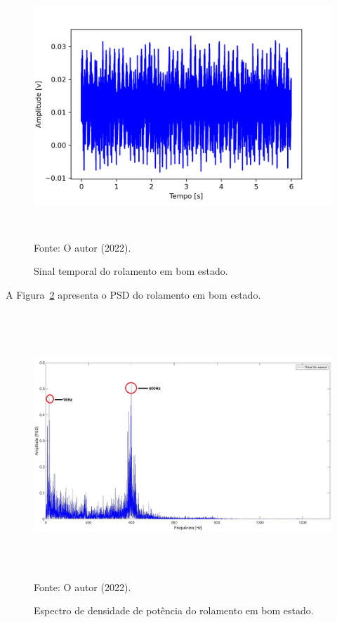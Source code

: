 \documentclass[
	12pt,				
	oneside,			
	a4paper,			
	english,			
	brazil,			
	]{abntex2ppgsi}
\begin{document}
{{{{{{{{{{{{{\begin{figure}[H]
\centering
\caption {Sinal temporal do rolamento em bom estado.}
\includegraphics[width=\textwidth,height=100mm,keepaspectratio]{Caso1/DOMINIO_TEMPO_ROLAMENTO_BOM} \\
Fonte: O autor (2022).
\label{DOMINIO_TEMPO_ROLAMENTO_BOM}
\end{figure} 


A Figura~\ref{PSD_ROLAMENTO_BOM} apresenta o PSD do rolamento em bom estado.

\begin{figure}[H]
\centering
\caption {Espectro de densidade de potência do rolamento em bom estado.}
\includegraphics[width=\textwidth,height=100mm,keepaspectratio]{GraficosAnalise/PSD_ROLAMENTO_BOM} \\
Fonte: O autor (2022).
\label{PSD_ROLAMENTO_BOM}
\end{figure} 

}}}}}}}}}}}}}
\end{document}
